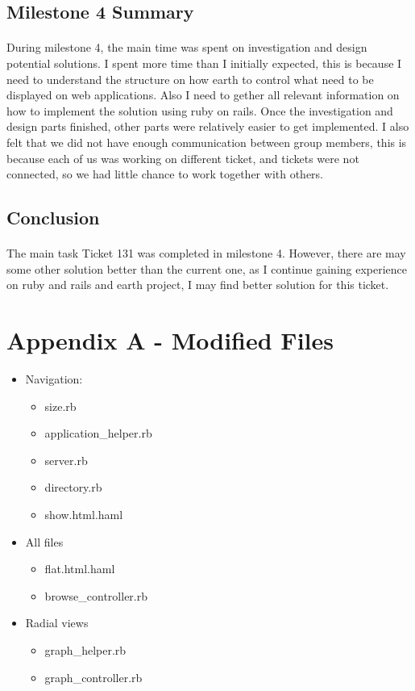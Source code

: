 \documentclass[10pt,a4,oneside]{article}
\begin{document}
\subsection*{Milestone 4 Summary}

\paragraph{}
During milestone 4, the main time was spent on investigation and design potential solutions. I spent more time than I initially expected, this is because I need to understand the structure on how earth to control what need to be displayed on web applications. Also I need to gether all relevant information on how to implement the solution using ruby on rails. Once the investigation and design parts finished, other parts were relatively easier to get implemented. I also felt that we did not have enough communication between group members, this is because each of us was working on different ticket, and tickets were not connected, so we had little chance to work together with others.

\subsection*{Conclusion}

\paragraph{}
The main task Ticket 131 was completed in milestone 4. However, there are may some other solution better than the current one, as I continue gaining experience on ruby and rails and earth project, I may find better solution for this ticket.

\section*{Appendix A - Modified Files}

\begin{itemize}
 \item Navigation:
	\begin{itemize}
 	\item size.rb
	\item application\_helper.rb
	\item server.rb
	\item directory.rb
	\item show.html.haml
	\end{itemize}
 \item All files
	\begin{itemize}
 	\item flat.html.haml
	\item browse\_controller.rb
	\end{itemize}
\item Radial views
	\begin{itemize}
 	\item graph\_helper.rb
	\item graph\_controller.rb
	\end{itemize}
\end{itemize}
\end{document}
